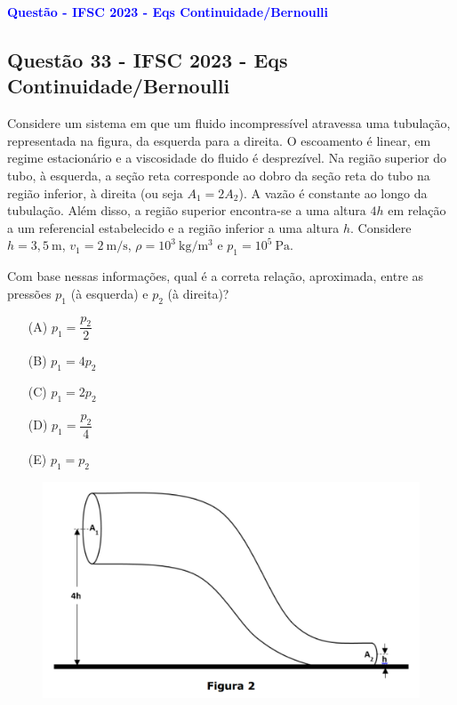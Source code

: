 \begin{flushleft}
\textbf{\textcolor{blue}{\Large Quest\~ao - IFSC 2023 - Eqs Continuidade/Bernoulli }}\\
\noindent

\subsection{Quest\~ao 33 - IFSC 2023 - Eqs Continuidade/Bernoulli }
Considere um sistema em que um fluido incompressível atravessa uma tubulação, representada na figura, da esquerda para a direita. O escoamento é linear, em regime estacionário e a viscosidade do fluido é desprezível. Na região superior do tubo, à esquerda, a seção reta corresponde ao dobro da seção reta do tubo na região inferior, à direita (ou seja \(A_1=2A_2\)). A vazão é constante ao longo da tubulação. Além disso, a região superior encontra-se a uma altura \(4h\) em relação a um referencial estabelecido e a região inferior a uma altura \(h\). Considere \(h = 3{,}5\ \mathrm{m}\), \(v_1 = 2\ \mathrm{m/s}\), \(\rho = 10^3\ \mathrm{kg/m^3}\) e \(p_1 = 10^5\ \mathrm{Pa}\).

Com base nessas informações, qual é a correta relação, aproximada, entre as pressões \(p_1\) (à esquerda) e \(p_2\) (à direita)?

\begin{itemize}
\item[(A)] \(p_{1} = \dfrac{p_{2}}{2}\)
\item[(B)] \(p_{1} = 4p_{2}\)
\item[(C)] \(p_{1} = 2p_{2}\)
\item[(D)] \(p_{1} = \dfrac{p_{2}}{4}\)
\item[(E)] \(p_{1} = p_{2}\)
\end{itemize}

\begin{figure}[!h]
    \centering
\includegraphics[scale=0.3]{figures/fluido_tubo_eqs_massa_bernoulli.png}
\end{figure}


\end{flushleft}
